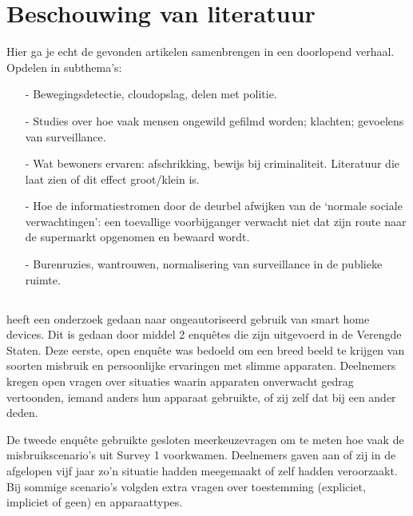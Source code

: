 \documentclass[nonacm,sigconf]{acmart}
\begin{document}
    \section{Beschouwing van literatuur}
    Hier ga je echt de gevonden artikelen samenbrengen in een doorlopend verhaal.
    Opdelen in subthema’s:

    \begin{itemize}[leftmargin = *,listparindent =1cm]
        \item[-] Bewegingsdetectie, cloudopslag, delen met politie.
        \item[-] Studies over hoe vaak mensen ongewild gefilmd worden; klachten; gevoelens van surveillance.
        \item[-] Wat bewoners ervaren: afschrikking, bewijs bij criminaliteit. Literatuur die laat zien of dit effect groot/klein is.
        \item[-] Hoe de informatiestromen door de deurbel afwijken van de ‘normale sociale verwachtingen’: een toevallige voorbijganger verwacht niet dat zijn route naar de supermarkt opgenomen en bewaard wordt.
        \item[-] Burenruzies, wantrouwen, normalisering van surveillance in de publieke ruimte.
    \end{itemize}

    \subsection{}

    \parencite{moh2023characterizing} heeft een onderzoek gedaan naar ongeautoriseerd gebruik van smart home devices.
    Dit is gedaan door middel 2 enquêtes die zijn uitgevoerd in de Verengde Staten.
    Deze eerste, open enquête was bedoeld om een breed beeld te krijgen van soorten misbruik en persoonlijke ervaringen met slimme apparaten.
    Deelnemers kregen open vragen over situaties waarin apparaten onverwacht gedrag vertoonden, iemand anders hun apparaat gebruikte, of zij zelf dat bij een ander deden.

    De tweede enquête gebruikte gesloten meerkeuzevragen om te meten hoe vaak de misbruikscenario’s uit Survey 1 voorkwamen.
    Deelnemers gaven aan of zij in de afgelopen vijf jaar zo’n situatie hadden meegemaakt of zelf hadden veroorzaakt.
    Bij sommige scenario’s volgden extra vragen over toestemming (expliciet, impliciet of geen) en apparaattypes.
\end{document}

